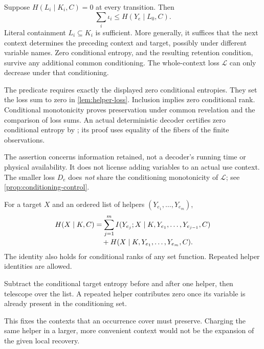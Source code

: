 \begin{lemma}\label{lem:retention}
Suppose $H(L_i\mid K_i,C)=0$ at every transition. Then
\[
\sum_i\iota_i\le H(Y_e\mid L_0,C).
\]
Literal containment $L_i\subseteq K_i$ is sufficient. More generally,
it suffices that the next context determines the preceding context and
target, possibly under different variable names. Zero conditional
entropy, and the resulting retention condition, survive any additional
common conditioning. The whole-context loss $\mathcal L$ can only
decrease under that conditioning.
\end{lemma}
\begin{outline}
The predicate  requires exactly the displayed zero
conditional entropies. They set the loss sum to zero in
\cref{lem:helper-loss}. Inclusion implies zero conditional rank.
Conditional monotonicity proves preservation under common revelation
and the comparison of loss sums. An actual deterministic decoder
certifies zero conditional entropy by
; its proof uses equality
of the fibers of the finite observations.
\end{outline}
The assertion concerns information retained, not a decoder's running
time or physical availability. It does not license adding variables to
an actual use context. The smaller loss $D_e$ does \emph{not} share the
conditioning monotonicity of $\mathcal L$; see
\cref{prop:conditioning-control}.

\begin{lemma}\label{lem:helper-expansion}
For a target $X$ and an ordered list of helpers
$(Y_{e_1},\ldots,Y_{e_m})$,
\begin{align}
H(X\mid K,C)
&=\sum_{j=1}^m I(Y_{e_j};X\mid K,Y_{e_1},\ldots,Y_{e_{j-1}},C)
\notag\\[-2pt]
&\hspace{1em}+H(X\mid K,Y_{e_1},\ldots,Y_{e_m},C).
\label{eq:helper-expansion}
\end{align}
The identity also holds for conditional ranks of any set function.
Repeated helper identities are allowed.
\end{lemma}
\begin{outline}
Subtract the conditional target entropy before and after one helper,
then telescope over the list. A repeated helper contributes zero once
its variable is already present in the conditioning set.
\end{outline}
This fixes the contexts that an occurrence cover must preserve. Charging
the same helper in a larger, more convenient context would not be the
expansion of the given local recovery.
